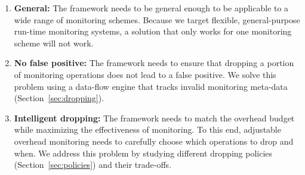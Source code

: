 \begin{enumerate}
  \item \textbf{General:} The framework needs to be general enough to be applicable to 
  a wide range of monitoring schemes. Because we target flexible, general-purpose
  run-time monitoring systems, a solution that only works for one monitoring scheme will
  not work.

  \item \textbf{No false positive:} The framework needs to ensure that dropping a portion
  of monitoring operations does not lead to a false positive. We solve this problem using
  a data-flow engine that tracks invalid monitoring meta-data (Section~\ref{sec:dropping}).

  \item \textbf{Intelligent dropping:} The framework needs to match the overhead budget
  while maximizing the effectiveness of monitoring. To this end, adjustable overhead
  monitoring needs to carefully choose which operations to drop and when. We address this
  problem by studying different dropping policies (Section~\ref{sec:policies}) and their
  trade-offs.

\end{enumerate}

